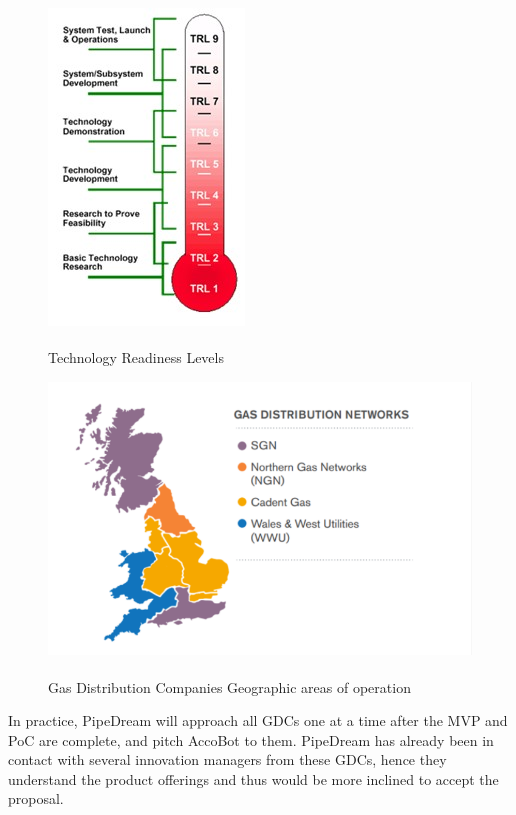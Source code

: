 \documentclass[11pt]{article}		%
\newlength{\imageheight}	 %
\newcommand{\supercite}[1]{\textsuperscript{\cite{#1}}}		%
\begin{document}
    	\begin{figure}[h]
    					\centering
    					\begin{multicols}{2}
    						\includegraphics[height=\imageheight]{TRL.jpg}
    						\caption{Technology Readiness Levels\supercite{trl}}
    						\label{techReadyLevels}
    						\columnbreak
    						\includegraphics[height=\imageheight]{distribution.pdf}
    						\caption{Gas Distribution Companies Geographic areas of operation\supercite{Gas_Distribution_Industry}}
    						\label{distrit2}
    					\end{multicols}
    				\end{figure}
    		\vspace{-0.5cm}
	    \hspace*{2ex}In practice, PipeDream will approach all GDCs one at a time after the MVP and PoC are complete, and pitch AccoBot to them. PipeDream has already been in contact with several innovation managers from these GDCs, hence they understand the product offerings and thus would be more inclined to accept the proposal. 
\end{document}
